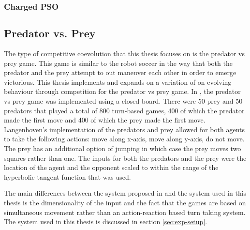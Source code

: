 \subsubsection{Charged PSO}




\subsection{Predator vs. Prey}
The type of competitive coevolution that this thesis focuses on is the predator vs prey game. This game is similar to the robot soccer in the way that both the predator and the prey attempt to out maneuver each other in order to emerge victorious. This thesis implements and expands on a variation of \cite{Langenhoven-2006} on evolving behaviour through competition for the predator vs prey game. In \cite{Langenhoven-2006}, the predator vs prey game was implemented using a closed board. There were 50 prey and 50 predators that played a total of 800 turn-based games, 400 of which the predator made the first move and 400 of which the prey made the first move. Langenhoven's implementation of the predators and prey allowed for both agents to take the following actions: move along x-axis, move along y-axis, do not move. The prey has an additional option of jumping in which case the prey moves two squares rather than one. The inputs for both the predators and the prey were the location of the agent and the opponent scaled to within the range of the hyperbolic tangent function that was used. 

The main differences between the system proposed in \cite{Langenhoven-2006} and the system used in this thesis is the dimensionality of the input and the fact that the games are based on simultaneous movement rather than an action-reaction based turn taking system. 
The system used in this thesis is discussed in section \ref{sec:exp-setup}.